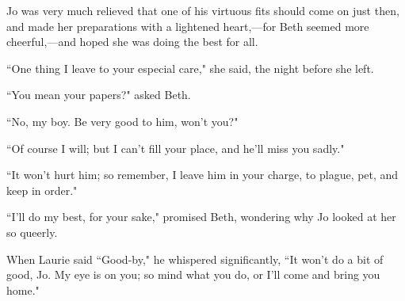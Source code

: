 Jo was very much relieved that one of his virtuous fits should come on
just then, and made her preparations with a lightened heart,---for Beth
seemed more cheerful,---and hoped she was doing the best for all.

``One thing I leave to your especial care," she said, the night before
she left.

``You mean your papers?" asked Beth.

``No, my boy. Be very good to him, won't you?"

``Of course I will; but I can't fill your place, and
he'll miss you sadly."

``It won't hurt him; so remember, I leave him in your
charge, to plague, pet, and keep in order."

``I'll do my best, for your sake," promised Beth,
wondering why Jo looked at her so queerly.

When Laurie said ``Good-by," he whispered significantly, ``It
won't do a bit of good, Jo. My eye is on you; so mind
what you do, or I'll come and bring you home."
